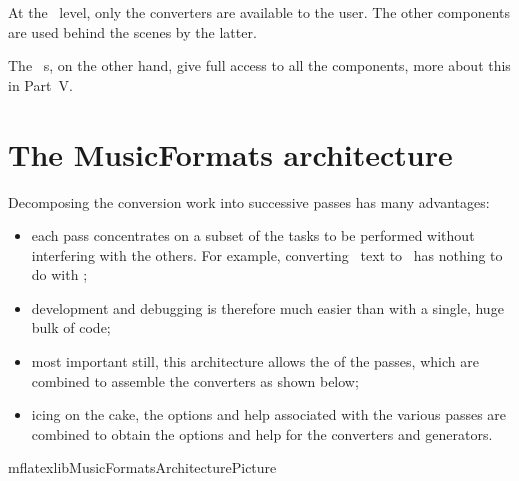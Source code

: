 At the \CLI\ level, only the converters are available to the user. The other components are used behind the scenes by the latter.

The \mf\ \API s, on the other hand, give full access to all the components, more about this in Part~V. %


\chapter{The MusicFormats architecture}\label{The MusicFormats architecture LABEL 1}

Decomposing the conversion work into successive passes has many advantages:
\begin{itemize}
\item each pass concentrates on a subset of the tasks to be performed without interfering with the others. For example, converting \mxml\ text to \msrRepr\ has nothing to do with \lily;

\item development and debugging is therefore much easier than with a single, huge bulk of code;

\item most important still, this architecture allows the  of the passes, which are combined to assemble the converters as shown below;

\item icing on the cake, the options and help associated with the various passes are combined to obtain the options and help for the converters and generators.
\end{itemize}


{mflatexlibMusicFormatsArchitecturePicture}

